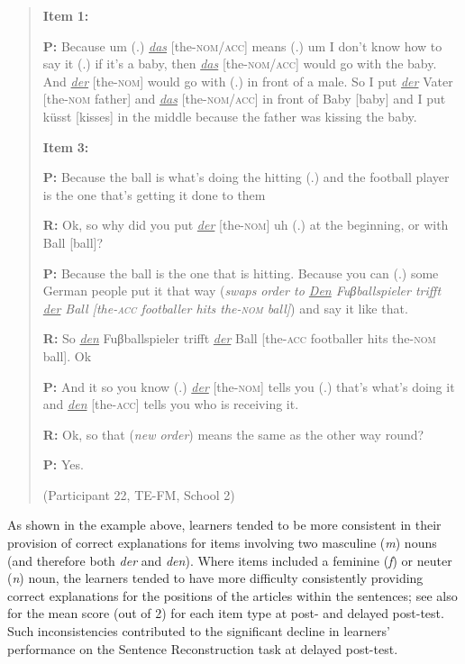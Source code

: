 \documentclass[output=paper]{langscibook}
\begin{document}
\begin{quote}
  \textbf{Item} \textbf{1:}

  \textbf{P:} Because um (.) \textit{\ul{das}} [the-\textsc{nom/acc}] means (.) um I don’t   know how to say it (.) if it’s a baby, then \textit{\ul{das}} [the-\textsc{nom/acc}]   would go with the baby. And \textit{\ul{der}} [the-\textsc{nom}] would go with (.)   in front of a male. So I put \textit{\ul{der}} Vater [the-\textsc{nom} father] and \textit{\ul{das}}   [the-\textsc{nom/acc}] in front of Baby [baby] and I put küsst   [kisses] in the middle because the father was kissing the baby.

  \textbf{Item} \textbf{3:}

  \textbf{P:} Because the ball is what’s doing the hitting (.) and the   football player is the one that’s getting it done to them

  \textbf{R:} Ok, so why did you put \textit{\ul{der}} [the-\textsc{nom}] uh (.) at the   beginning, or with Ball [ball]?

  \textbf{P:} Because the ball is the one that is hitting. Because you can   (.) some German people put it that way (\textit{swaps} \textit{order to \ul{Den}   Fuβballspieler trifft \ul{der} Ball [the-\textsc{acc} footballer hits the-\textsc{nom}   ball]}) and say it like that.

  \textbf{R:} So \textit{\ul{den}} Fuβballspieler trifft \textit{\ul{der}} Ball [the-\textsc{acc} footballer hits   the-\textsc{nom} ball]. Ok

  \textbf{P:} And it so you know (.) \textit{\ul{der}} [the-\textsc{nom}] tells you (.) that’s   what’s doing it and \textit{\ul{den}} [the-\textsc{acc}] tells you who is receiving it.

  \textbf{R:} Ok, so that (\textit{new order}) means the same as the other way   round?

  \textbf{P:} Yes. 

(Participant 22, TE-FM, School 2)
\end{quote}

As shown in the example above, learners tended to be more consistent in their provision of correct explanations for items involving two masculine (\textit{m}) nouns (and therefore both \textit{der} and \textit{den}). Where items included a feminine (\textit{f}) or neuter (\textit{n}) noun, the learners tended to have more difficulty consistently providing correct explanations for the positions of the articles within the sentences; see also  for the mean score (out of 2) for each item type at post- and delayed post-test. Such inconsistencies contributed to the significant decline in learners’ performance on the Sentence Reconstruction task at delayed post-test.
\end{document}

